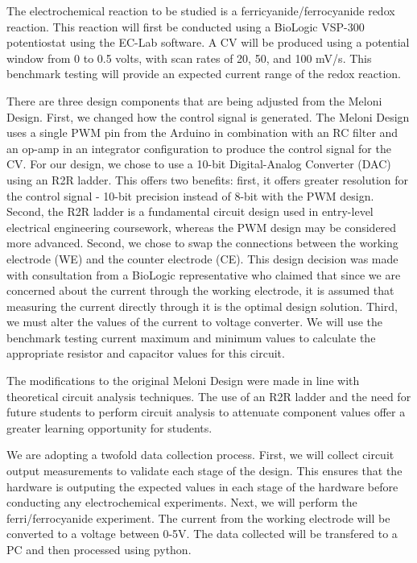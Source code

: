 \documentclass{article}
\begin{document}
The electrochemical reaction to be studied is a ferricyanide/ferrocyanide redox reaction. This reaction will first be conducted using a BioLogic VSP-300 potentiostat using the EC-Lab software. A CV will be produced using a potential window from 0 to 0.5 volts, with scan rates of 20, 50, and 100 mV/s. This benchmark testing will provide an expected current range of the redox reaction. 

There are three design components that are being adjusted from the Meloni Design. First, we changed how the control signal is generated. The Meloni Design uses a single PWM pin from the Arduino in combination with an RC filter and an op-amp in an integrator configuration to produce the control signal for the CV. For our design, we chose to use a 10-bit Digital-Analog Converter (DAC) using an R2R ladder. This offers two benefits: first, it offers greater resolution for the control signal - 10-bit precision instead of 8-bit with the PWM design. Second, the R2R ladder is a fundamental circuit design used in entry-level electrical engineering coursework, whereas the PWM design may be considered more advanced. Second, we chose to swap the connections between the working electrode (WE) and the counter electrode (CE). This design decision was made with consultation from a BioLogic representative who claimed that since we are concerned about the current through the working electrode, it is assumed that measuring the current directly through it is the optimal design solution. Third, we must alter the values of the current to voltage converter. We will use the benchmark testing current maximum and minimum values to calculate the appropriate resistor and capacitor values for this circuit.

The modifications to the original Meloni Design were made in line with theoretical circuit analysis techniques. The use of an R2R ladder and the need for future students to perform circuit analysis to attenuate component values offer a greater learning opportunity for students.

We are adopting a twofold data collection process. First, we will collect circuit output measurements to validate each stage of the design. This ensures that the hardware is outputing the expected values in each stage of the hardware before conducting any electrochemical experiments. Next, we will perform the ferri/ferrocyanide experiment. The current from the working electrode will be converted to a voltage between 0-5V. The data collected will be transfered to a PC and then processed using python.
\end{document}
